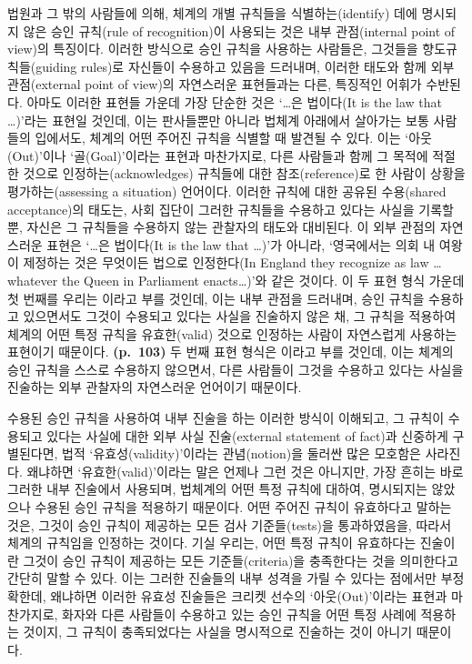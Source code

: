 법원과 그 밖의 사람들에 의해, 체계의 개별 규칙들을 식별하는(identify)
데에 명시되지 않은 승인 규칙(rule of recognition)이 사용되는 것은 내부
관점(internal point of view)의 특징이다. 이러한 방식으로 승인 규칙을
사용하는 사람들은, 그것들을 향도규칙들(guiding rules)로 자신들이
수용하고 있음을 드러내며, 이러한 태도와 함께 외부 관점(external point of
view)의 자연스러운 표현들과는 다른, 특징적인 어휘가 수반된다. 아마도
이러한 표현들 가운데 가장 단순한 것은 ‘\ldots 은 법이다(It is the law
that \ldots)’라는 표현일 것인데, 이는 판사들뿐만 아니라 법체계 아래에서
살아가는 보통 사람들의 입에서도, 체계의 어떤 주어진 규칙을 식별할 때
발견될 수 있다. 이는 ‘아웃(Out)’이나 ‘골(Goal)’이라는 표현과 마찬가지로,
다른 사람들과 함께 그 목적에 적절한 것으로 인정하는(acknowledges)
규칙들에 대한 참조(reference)로 한 사람이 상황을 평가하는(assessing a
situation) 언어이다. 이러한 규칙에 대한 공유된 수용(shared acceptance)의
태도는, 사회 집단이 그러한 규칙들을 수용하고 있다는 사실을
 기록할 뿐, 자신은 그 규칙들을 수용하지 않는
관찰자의 태도와 대비된다. 이 외부 관점의 자연스러운 표현은 ‘\ldots 은
법이다(It is the law that \ldots)’가 아니라, ‘영국에서는 의회 내 여왕이
제정하는 것은 무엇이든 법으로 인정한다(In England they recognize as law
\ldots{} whatever the Queen in Parliament enacts\ldots)’와 같은 것이다.
이 두 표현 형식 가운데 첫 번째를 우리는 이라고 부를 것인데, 이는 내부 관점을 드러내며, 승인 규칙을
수용하고 있으면서도 그것이 수용되고 있다는 사실을 진술하지 않은 채, 그
규칙을 적용하여 체계의 어떤 특정 규칙을 유효한(valid) 것으로 인정하는
사람이 자연스럽게 사용하는 표현이기 때문이다. \textbf{(p.~103)} 두 번째
표현 형식은 이라고 부를 것인데, 이는
체계의 승인 규칙을 스스로 수용하지 않으면서, 다른 사람들이 그것을
수용하고 있다는 사실을 진술하는 외부 관찰자의 자연스러운 언어이기
때문이다.

수용된 승인 규칙을 사용하여 내부 진술을 하는 이러한 방식이 이해되고, 그
규칙이 수용되고 있다는 사실에 대한 외부 사실 진술(external statement of
fact)과 신중하게 구별된다면, 법적 ‘유효성(validity)’이라는
관념(notion)을 둘러싼 많은 모호함은 사라진다. 왜냐하면
‘유효한(valid)’이라는 말은 언제나 그런 것은 아니지만, 가장 흔히는 바로
그러한 내부 진술에서 사용되며, 법체계의 어떤 특정 규칙에 대하여,
명시되지는 않았으나 수용된 승인 규칙을 적용하기 때문이다. 어떤 주어진
규칙이 유효하다고 말하는 것은, 그것이 승인 규칙이 제공하는 모든 검사
기준들(tests)을 통과하였음을, 따라서 체계의 규칙임을 인정하는 것이다.
기실 우리는, 어떤 특정 규칙이 유효하다는 진술이란 그것이 승인 규칙이
제공하는 모든 기준들(criteria)을 충족한다는 것을 의미한다고 간단히 말할
수 있다. 이는 그러한 진술들의 내부 성격을 가릴 수 있다는 점에서만
부정확한데, 왜냐하면 이러한 유효성 진술들은 크리켓 선수의
‘아웃(Out)’이라는 표현과 마찬가지로, 화자와 다른 사람들이 수용하고 있는
승인 규칙을 어떤 특정 사례에 적용하는 것이지, 그 규칙이 충족되었다는
사실을 명시적으로 진술하는 것이 아니기 때문이다.

